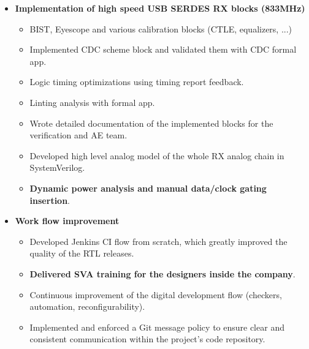 \begin{cventries}
{\begin{cvitems}
\begin{itemize}
\begin{itemize}
            \item {Setup and configured the C toolchain in the simulation environment, enabling efficient and accurate testing and validation of designs.}
            \item {Effectively interfaced with external Design Verification (DV) contractors to ensure seamless integration of their deliverables into the project, resulting in successful project completion.}
          \end{itemize}
          \item {\textbf{Implementation of high speed USB SERDES RX blocks (833MHz)}}
          \begin{itemize}
            \item {BIST, Eyescope and various calibration blocks (CTLE, equalizers, ...)}
            \item {Implemented CDC scheme block and validated them with CDC formal app.}
            \item {Logic timing optimizations using timing report feedback.}
            \item {Linting analysis with formal app.}
            \item {Wrote detailed documentation of the implemented blocks for the verification and AE team.}
            \item {Developed high level analog model of the whole RX analog chain in SystemVerilog.}
            \item {\textbf{Dynamic power analysis and manual data/clock gating insertion}.}
          \end{itemize}
          \item {\textbf{Work flow improvement}}
          \begin{itemize}
            \item {Developed Jenkins CI flow from scratch, which greatly improved the quality of the RTL releases.}
            \item {\textbf{Delivered SVA training for the designers inside the company}.}
            \item {Continuous improvement of the digital development flow (checkers, automation, reconfigurability).}
            \item {Implemented and enforced a Git message policy to ensure clear and consistent communication within the project's code repository.}

\end{itemize}
\end{itemize}
\end{cvitems}}
\end{cventries}
